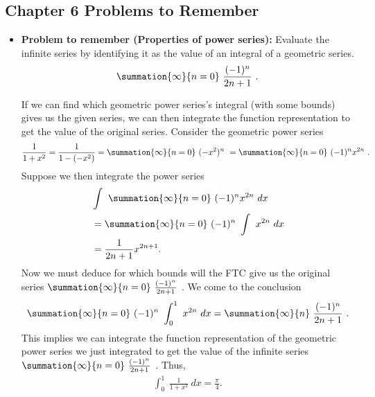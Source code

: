 \documentclass{report}
\begin{document}
\subsection{Chapter 6 Problems to Remember}
\begin{itemize}
    \item \textbf{Problem to remember (Properties of power series):} Evaluate the infinite series by identifying it as the value of an integral of a geometric series.
        \begin{align*}
            \summation{\infty}{n=0}\ \frac{(-1)^{n}}{2n+1}\ 
        .\end{align*}
        \begin{remark}
            If we can find which geometric power series's integral (with some bounds) gives us the given series, we can then integrate the function representation to get the value of the original series. Consider the geometric power series
            \begin{align*}
                \frac{1}{1+x^{2}} = \frac{1}{1-(-x^{2})} = \summation{\infty}{n=0}\ (-x^{2})^{n}\  = \summation{\infty}{n=0}\ (-1)^{n}x^{2n}\ 
            .\end{align*}
            Suppose we then integrate the power series
            \begin{align*}
                        &\int_{}^{}\ \summation{\infty}{n=0}\ (-1)^{n}x^{2n}\ dx \\
                        &=\summation{\infty}{n=0}\ (-1)^{n}\ \int_{}^{}\ x^{2n}\ dx \\
                        &=\frac{1}{2n+1}x^{2n+1}
                    .\end{align*}
                    Now we must deduce for which bounds will the FTC give us the original series $\summation{\infty}{n=0}\ \frac{(-1)^{n}}{2n+1}\  $. We come to the conclusion
                    \begin{align*}
                        \summation{\infty}{n=0}\ (-1)^{n}\ \int_{0}^{1}\ x^{2n}\ dx = \summation{\infty}{n}\ \frac{(-1)^{n}}{2n+1}\ 
                    .\end{align*}
                    This implies we can integrate the function representation of the geometric power series we just integrated to get the value of the infinite series $\summation{\infty}{n=0}\ \frac{(-1)^{n}}{2n+1}\  $. Thus,
                    \begin{align*}
                        \int_{0}^{1}\ \frac{1}{1+x^{2}}\ dx = \frac{\pi}{4}
                    .\end{align*}

\end{remark}
\end{itemize}
\end{document}
